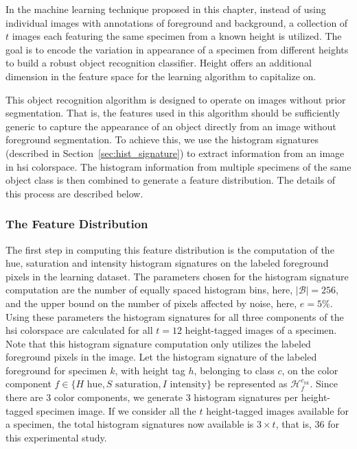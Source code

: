 In the machine learning technique proposed in this chapter, instead of using individual images with annotations of foreground and background, a collection of $t$ images each featuring the same specimen from a known height is utilized. The goal is to encode the variation in appearance of a specimen from different heights to build a robust object recognition classifier. Height offers an additional dimension in the feature space for the learning algorithm to capitalize on.

This object recognition algorithm is designed to operate on images without prior segmentation. That is, the features used in this algorithm should be sufficiently generic to capture the appearance of an object directly from an image without foreground segmentation. To achieve this, we use the histogram signatures (described in Section~\ref{sec:hist_signature}) to extract information from an image in \gls{hsi} colorspace. The histogram information from multiple specimens of the same object class is then combined to generate a feature distribution. The details of this process are described below.

\subsubsection{The Feature Distribution}
\label{sec:distdes_feature_distr}

The first step in computing this feature distribution is the computation of the hue, saturation and intensity histogram signatures on the labeled foreground pixels in the learning dataset. The parameters chosen for the histogram signature computation are the number of equally spaced histogram bins, here, $|\mathcal{B}|=256$, and the upper bound on the number of pixels affected by noise, here, $e=5\%$. Using these parameters the histogram signatures for all three components of the \gls{hsi} colorspace are calculated for all $t=12$ height-tagged images of a specimen. Note that this histogram signature computation only utilizes the labeled foreground pixels in the image. Let the histogram signature of the labeled foreground for specimen $k$, with height tag $h$, belonging to class $c$, on the color component $f\in\{H \text{ hue}, S \text{ saturation}, I \text{ intensity}\}$ be represented as $\mathcal{H}^{c_{hk}}_f$. Since there are 3 color components, we generate 3 histogram signatures per height-tagged specimen image. If we 
consider all the $t$ height-tagged images available for a specimen, the total histogram signatures now available is $3\times t$, that is, 36 for this experimental study.

